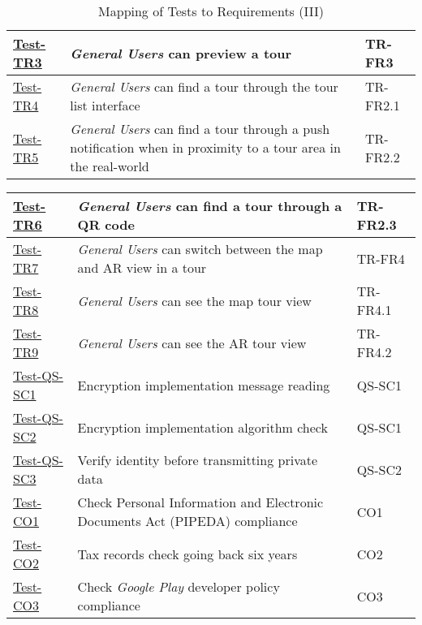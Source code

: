 \documentclass[12pt, titlepage]{article}
\begin{document}
\begin{table}[htpb!]
\begin{tabular}{|l|p{8cm}|p{3cm}|}
        \hline
        \hyperref[itm:Test-TR3]{Test-TR3} & \textit{General Users} can preview a tour & TR-FR3 \\
        \hline
        \hyperref[itm:Test-TR4]{Test-TR4} & \textit{General Users} can find a tour through the tour list interface & TR-FR2.1 \\
        \hline
        \hyperref[itm:Test-TR5]{Test-TR5} & \textit{General Users} can find a tour through a push notification when in proximity to a tour area in the real-world & TR-FR2.2 \\
        \hline
    \end{tabular}
    \caption{Mapping of Tests to Requirements (III)}
    \label{tab:test_requirements3}
\end{table}

\begin{table}[htpb!]
    \centering
    \begin{tabular}{|l|p{8cm}|p{3cm}|}
        \hline
        \hyperref[itm:Test-TR6]{Test-TR6} & \textit{General Users} can find a tour through a QR code & TR-FR2.3 \\
        \hline
        \hyperref[itm:Test-TR7]{Test-TR7} & \textit{General Users} can switch between the map and AR view in a tour & TR-FR4 \\
        \hline
        \hyperref[itm:Test-TR8]{Test-TR8} & \textit{General Users} can see the map tour view \label{itm:Test-TR8} & TR-FR4.1 \\
        \hline
        \hyperref[itm:Test-TR9]{Test-TR9} & \textit{General Users} can see the AR tour view & TR-FR4.2 \\
        \hline
        \hyperref[itm:Test-QS-SC1]{Test-QS-SC1} & Encryption implementation message reading & QS-SC1 \\
        \hline
        \hyperref[itm:Test-QS-SC2]{Test-QS-SC2} & Encryption implementation algorithm check & QS-SC1 \\
        \hline
        \hyperref[itm:Test-QS-SC3]{Test-QS-SC3} & Verify identity before transmitting private data & QS-SC2 \\
        \hline
        \hyperref[itm:Test-CO1]{Test-CO1} & Check Personal Information and Electronic Documents Act (PIPEDA) \cite{PIPEDA} compliance & CO1 \\
        \hline
        \hyperref[itm:Test-CO2]{Test-CO2} & Tax records check going back six years & CO2 \\
        \hline
        \hyperref[itm:Test-CO3]{Test-CO3} & Check \textit{Google Play} developer policy \cite{GooglePlay} compliance & CO3 \\

\end{tabular}
\end{table}
\end{document}
